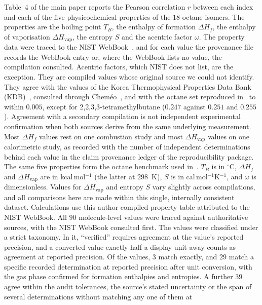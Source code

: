 \documentclass[a5paper, 10pt]{article}
\theoremstyle{plain}
\theoremstyle{remark}
\theoremstyle{definition}
\begin{document}
Table~4 of the main paper reports the Pearson correlation $r$ between
each index and each of the five physicochemical properties of the
$18$ octane isomers. The properties are the boiling point $T_B$, the
enthalpy of formation $\Delta H_f$, the enthalpy of vaporisation
$\Delta H_{\mathrm{vap}}$, the entropy $S$ and the acentric factor
$\omega$. The property data were traced to the NIST
WebBook~\cite{NISTWebBook}, and for each value the provenance file
records the WebBook entry or, where the WebBook lists no value, the
compilation consulted. Acentric factors, which NIST does not list, are the exception. They are compiled values whose original source we could not identify. They agree with the values of the Korea Thermophysical Properties Data Bank (KDB)~\cite{KDB}, consulted through Chem\'eo~\cite{Chemeo}, and with the octane set reproduced in~\cite{Ediz2017Octane} to within $0.005$, except for 2,2,3,3-tetramethylbutane ($0.247$ against $0.251$ and $0.255$). Agreement with a secondary compilation is not independent experimental confirmation when both sources derive from the same underlying measurement. Most $\Delta H_f$ values rest on one combustion study and most $\Delta H_{\mathrm{vap}}$ values on one calorimetric study, as recorded with the number of independent determinations behind each value in the claim provenance ledger of the reproducibility package.
The same five properties form the octane benchmark used
in~\cite{MovahediGutmanRedzepovicFurtula2026}. $T_B$ is in
$^{\circ}$C, $\Delta H_f$ and $\Delta H_{\mathrm{vap}}$ are in
kcal\,mol$^{-1}$ (the latter at $298$~K), $S$ is in
cal\,mol$^{-1}$K$^{-1}$, and $\omega$ is dimensionless. Values for
$\Delta H_{\mathrm{vap}}$ and entropy $S$ vary slightly across
compilations, and all comparisons here are made within this single,
internally consistent dataset. Calculations use this author-compiled
property table attributed to the NIST WebBook. All $90$
molecule-level values were traced against authoritative sources, with
the NIST WebBook consulted first. The values were
classified under a strict taxonomy. In it, ``verified'' requires
agreement at the value's reported precision, and a converted value
exactly half a display unit away counts as agreement at reported
precision. Of the values, $3$ match exactly, and $29$ match a specific
recorded determination at reported precision after unit conversion,
with the gas phase confirmed for formation enthalpies and entropies.
A further $39$ agree
within the audit tolerances, the source's stated uncertainty or the
span of several determinations without matching any one of them at
\end{document}
